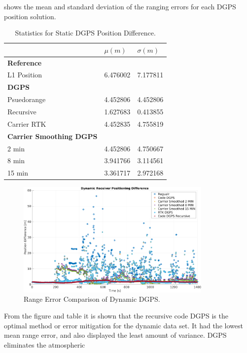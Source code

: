 \documentclass[11pt]{article}
\begin{document}
\begin{enumerate}[label=\textbf{\arabic*.}]
      shows the mean and standard deviation of the ranging errors for each DGPS position 
      solution.
      \begin{table}[H]
        \centering
        \caption{Statistics for Static DGPS Position Difference.}
        \begin{tabular}{ P{5cm}|P{3cm} P{3cm} }
          & \boldmath$\mu (m)$ & \boldmath$\sigma (m)$ \\
          \hline
          \textbf{Reference} &  \\
          L1 Position & 6.476002 & 7.177811 \\
          \hline
          \textbf{DGPS} &  \\
          Psuedorange & 4.452806 & 4.452806 \\
          Recursive & 1.627683 & 0.413855 \\
          Carrier RTK & 4.452835 & 4.755819 \\
          \hline
          \textbf{Carrier Smoothing DGPS} &  \\
          2 min & 4.452806 & 4.750667 \\
          8 min & 3.941766 & 3.114561 \\
          15 min & 3.361717 & 2.972168
        \end{tabular}
      \end{table}
      \begin{figure}[H]
          \centering
          \includegraphics[width=0.85\textwidth]{p3_comp.png}
          \caption{Range Error Comparison of Dynamic DGPS.}
      \end{figure}
      From the figure and table it is shown that the recursive code DGPS is the optimal 
      method or error mitigation for the dynamic data set. It had the lowest mean range 
      error, and also displayed the least amount of variance. DGPS eliminates the atmospheric 

\end{enumerate}
\end{document}
